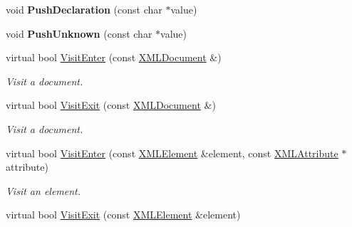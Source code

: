 \begin{DoxyCompactItemize}
void {\bfseries Push\+Declaration} (const char $\ast$value)
\item 
\mbox{\label{classtinyxml2_1_1_x_m_l_printer_ab1efc6d1548505e9984185f58f54b713}} 
void {\bfseries Push\+Unknown} (const char $\ast$value)
\item 
\mbox{\label{classtinyxml2_1_1_x_m_l_printer_a9aa1de11a55a07db55a90fde37d7afad}} 
virtual bool \mbox{\hyperlink{classtinyxml2_1_1_x_m_l_printer_a9aa1de11a55a07db55a90fde37d7afad}{Visit\+Enter}} (const \mbox{\hyperlink{classtinyxml2_1_1_x_m_l_document}{X\+M\+L\+Document}} \&)
\begin{DoxyCompactList}\small\item\em Visit a document. \end{DoxyCompactList}\item 
\mbox{\label{classtinyxml2_1_1_x_m_l_printer_a15fc1f2b922f540917dcf52808737b29}} 
virtual bool \mbox{\hyperlink{classtinyxml2_1_1_x_m_l_printer_a15fc1f2b922f540917dcf52808737b29}{Visit\+Exit}} (const \mbox{\hyperlink{classtinyxml2_1_1_x_m_l_document}{X\+M\+L\+Document}} \&)
\begin{DoxyCompactList}\small\item\em Visit a document. \end{DoxyCompactList}\item 
\mbox{\label{classtinyxml2_1_1_x_m_l_printer_a169b2509d8eabb70811b2bb8cfd1f5d1}} 
virtual bool \mbox{\hyperlink{classtinyxml2_1_1_x_m_l_printer_a169b2509d8eabb70811b2bb8cfd1f5d1}{Visit\+Enter}} (const \mbox{\hyperlink{classtinyxml2_1_1_x_m_l_element}{X\+M\+L\+Element}} \&element, const \mbox{\hyperlink{classtinyxml2_1_1_x_m_l_attribute}{X\+M\+L\+Attribute}} $\ast$attribute)
\begin{DoxyCompactList}\small\item\em Visit an element. \end{DoxyCompactList}\item 
\mbox{\label{classtinyxml2_1_1_x_m_l_printer_a2edd48405971a88951c71c9df86a2f50}} 
virtual bool \mbox{\hyperlink{classtinyxml2_1_1_x_m_l_printer_a2edd48405971a88951c71c9df86a2f50}{Visit\+Exit}} (const \mbox{\hyperlink{classtinyxml2_1_1_x_m_l_element}{X\+M\+L\+Element}} \&element)

\end{DoxyCompactItemize}
